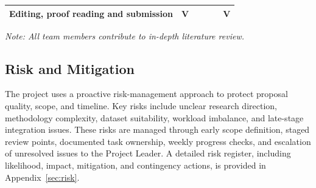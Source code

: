 \begin{table}[H]
{\begin{tabular}{|l|c|l|l|l|c|}
Editing, proof reading and submission                                  & V                                                                             &                                                                                       &                                                                                     &                                                                                       & V                                                               \\ \hline
\end{tabular}%
}
\noindent \textit{Note: All team members contribute to in-depth literature review.}

\end{table}

\subsection{Risk and Mitigation}
The project uses a proactive risk-management approach to protect proposal quality, scope, and timeline. Key risks include unclear research direction, methodology complexity, dataset suitability, workload imbalance, and late-stage integration issues. These risks are managed through early scope definition, staged review points, documented task ownership, weekly progress checks, and escalation of unresolved issues to the Project Leader. A detailed risk register, including likelihood, impact, mitigation, and contingency actions, is provided in Appendix~\ref{sec:risk}.
